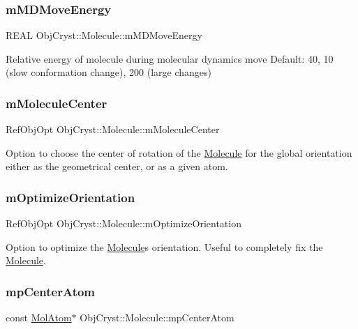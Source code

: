 \subsubsection{\texorpdfstring{mMDMoveEnergy}{mMDMoveEnergy}}
{\footnotesize\ttfamily R\+E\+AL Obj\+Cryst\+::\+Molecule\+::m\+M\+D\+Move\+Energy}

Relative energy of molecule during molecular dynamics move Default\+: 40, 10 (slow conformation change), 200 (large changes) \mbox{\label{class_obj_cryst_1_1_molecule_a4ac986f017f968e59af58297b4a50d7f}} 
\subsubsection{\texorpdfstring{mMoleculeCenter}{mMoleculeCenter}}
{\footnotesize\ttfamily Ref\+Obj\+Opt Obj\+Cryst\+::\+Molecule\+::m\+Molecule\+Center}

Option to choose the center of rotation of the \mbox{\hyperlink{class_obj_cryst_1_1_molecule}{Molecule}} for the global orientation either as the geometrical center, or as a given atom. \mbox{\label{class_obj_cryst_1_1_molecule_a8c82ea548f4c0f29e868776c88c5eab8}} 
\subsubsection{\texorpdfstring{mOptimizeOrientation}{mOptimizeOrientation}}
{\footnotesize\ttfamily Ref\+Obj\+Opt Obj\+Cryst\+::\+Molecule\+::m\+Optimize\+Orientation}

Option to optimize the \mbox{\hyperlink{class_obj_cryst_1_1_molecule}{Molecule}}\textquotesingle{}s orientation. Useful to completely fix the \mbox{\hyperlink{class_obj_cryst_1_1_molecule}{Molecule}}. \mbox{\label{class_obj_cryst_1_1_molecule_a924f7062c1e35790e152a35166121266}} 
\subsubsection{\texorpdfstring{mpCenterAtom}{mpCenterAtom}}
{\footnotesize\ttfamily const \mbox{\hyperlink{class_obj_cryst_1_1_mol_atom}{Mol\+Atom}}$\ast$ Obj\+Cryst\+::\+Molecule\+::mp\+Center\+Atom}

